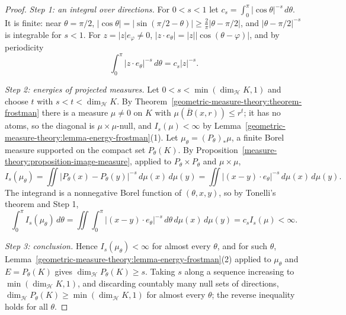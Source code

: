 \begin{proof}
\emph{Step 1: an integral over directions.} For $0 < s < 1$ let $c_s = \int_0^\pi|\cos\theta|^{-s}\,d\theta$. It is finite: near $\theta = \pi/2$, $|\cos\theta| = |\sin(\pi/2 - \theta)| \geq \frac2\pi|\theta - \pi/2|$, and
$|\theta - \pi/2|^{-s}$ is integrable for $s < 1$. For $z = |z|e_\varphi \neq 0$, $|z \cdot e_\theta| = |z||\cos(\theta - \varphi)|$, and by periodicity
\[
\int_0^\pi|z \cdot e_\theta|^{-s}\,d\theta = c_s|z|^{-s}.
\]

\emph{Step 2: energies of projected measures.} Let $0 < s < \min(\dim_{\mathcal{H}}K, 1)$ and choose $t$ with $s < t < \dim_{\mathcal{H}}K$. By Theorem~\ref{geometric-measure-theory:theorem-frostman} there is a measure
$\mu \neq 0$ on $K$ with $\mu(\overline{B}(x, r)) \leq r^t$; it has no atoms, so the diagonal is $\mu \times \mu$-null, and $I_s(\mu) < \infty$ by Lemma~\ref{geometric-measure-theory:lemma-energy-frostman}(1). Let
$\mu_\theta = (P_\theta)_*\mu$, a finite Borel measure supported on the compact set $P_\theta(K)$. By Proposition~\ref{measure-theory:proposition-image-measure}, applied to $P_\theta \times P_\theta$ and $\mu \times \mu$,
\[
I_s(\mu_\theta) = \iint|P_\theta(x) - P_\theta(y)|^{-s}\,d\mu(x)\,d\mu(y) = \iint|(x - y) \cdot e_\theta|^{-s}\,d\mu(x)\,d\mu(y).
\]
The integrand is a nonnegative Borel function of $(\theta, x, y)$, so by Tonelli's theorem and Step 1,
\[
\int_0^\pi I_s(\mu_\theta)\,d\theta = \iint\int_0^\pi|(x - y) \cdot e_\theta|^{-s}\,d\theta\,d\mu(x)\,d\mu(y) = c_sI_s(\mu) < \infty .
\]

\emph{Step 3: conclusion.} Hence $I_s(\mu_\theta) < \infty$ for almost every $\theta$, and for such $\theta$, Lemma~\ref{geometric-measure-theory:lemma-energy-frostman}(2) applied to $\mu_\theta$ and $E = P_\theta(K)$ gives
$\dim_{\mathcal{H}}P_\theta(K) \geq s$. Taking $s$ along a sequence increasing to $\min(\dim_{\mathcal{H}}K, 1)$, and discarding countably many null sets of directions, $\dim_{\mathcal{H}}P_\theta(K) \geq \min(\dim_{\mathcal{H}}K, 1)$
for almost every $\theta$; the reverse inequality holds for all $\theta$.
\end{proof}

